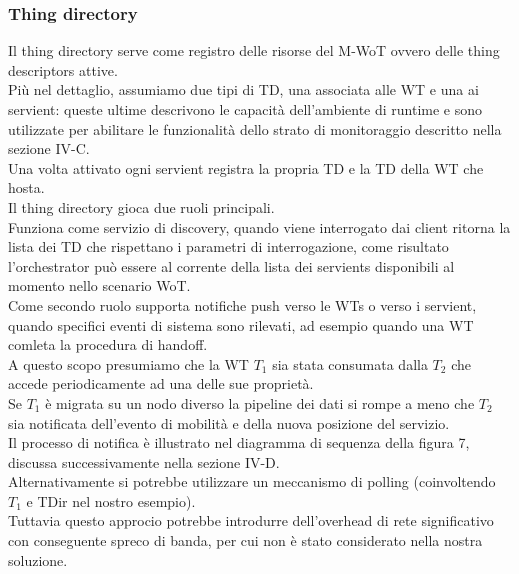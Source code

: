 \documentclass[11pt]{article}
\begin{document}
		\subsubsection{Thing directory}
		Il thing directory serve come registro delle risorse del M-WoT ovvero delle thing descriptors attive. \\ Più nel dettaglio, assumiamo due tipi di TD, una associata alle WT e una ai servient: queste ultime descrivono le capacità dell'ambiente di runtime e sono utilizzate per abilitare le funzionalità dello strato di monitoraggio descritto nella sezione IV-C.\\ 
		Una volta attivato ogni servient registra la propria TD e la TD della WT che hosta.\\
		Il thing directory gioca due ruoli principali. \\
		Funziona come servizio di discovery, quando viene interrogato dai client ritorna la lista dei TD che rispettano i parametri di interrogazione, come risultato l'orchestrator può essere al corrente della lista dei servients disponibili al momento nello scenario WoT.\\
		Come secondo ruolo supporta notifiche push verso le WTs o verso i servient, quando specifici eventi di sistema sono rilevati, ad esempio quando una WT comleta la procedura di handoff. \\
		A questo scopo presumiamo che la WT $T_1$ sia stata consumata dalla $T_2$ che accede periodicamente ad una delle sue proprietà. \\
		Se $T_1$ è migrata su un nodo diverso la pipeline dei dati si rompe a meno che $T_2$ sia notificata dell'evento di mobilità e della nuova posizione del servizio. \\
		Il processo di notifica è illustrato nel diagramma di sequenza della figura 7, discussa successivamente nella sezione IV-D. \\
		Alternativamente si potrebbe utilizzare un meccanismo di polling (coinvoltendo $T_1$ e TDir nel nostro esempio).\\
		Tuttavia questo approcio potrebbe introdurre dell'overhead di rete significativo con conseguente spreco di banda, per cui non è stato considerato nella nostra soluzione.
\end{document}
